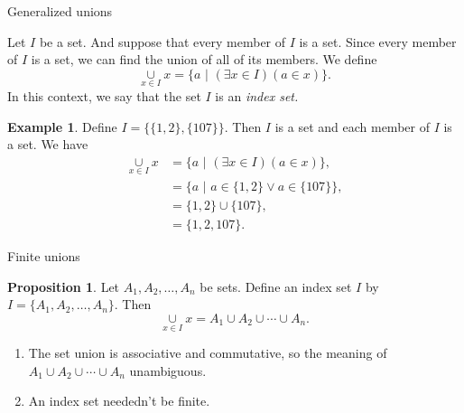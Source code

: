 \documentclass[fleqn]{beamer}
\theoremstyle{definition}
\newtheorem{myex}{Example}
\newtheorem{myth}{Proposition}
\begin{document}
\begin{frame}{Generalized unions}

Let \(I\) be a set. And suppose that every member of \(I\) is a set.  Since every member of \(I\) is a set, we can find the union of all of its members. We define
\[
    \underset{x \in I}{\cup} x  = \{ a  \, \,  | \, \, (\exists x \in I)(a \in x) \}.
\]
In this context, we say that the set \(I\) is an \emph{index set.}

\begin{myex}  Define \(I = \{ \{1,2\}, \{107\} \} \). Then \(I\) is a set and each member of \(I\) is a set. We have
\begin{align*}
 \underset{x \in I}{\cup} x  &= \{ a  \, \,  | \, \, (\exists x \in I)(a \in x) \}, \\
                                                   &= \{ a  \, \,  | \, \,   a \in   \{1,2\}  \lor    a \in   \{107\} \}, \\
                                                   &= \{1,2\}  \cup \{107\}, \\
                                                   &= \{1,2,107\}.
\end{align*}

\end{myex}
\end{frame}

\begin{frame}{Finite unions}
\begin{myth} Let \(A_1, A_2, \dots, A_n\) be sets.  Define an index set \(I\) by  \(I = \{A_1, A_2, \dots, A_n \} \). Then
\[
   \underset{x \in I}{\cup} x = A_1 \cup A_2 \cup \cdots \cup A_n.
\]
\end{myth}
\begin{enumerate}
  \item The set union is associative and commutative, so  the meaning of \(A_1 \cup A_2 \cup \cdots \cup A_n \) unambiguous.

  \item An index set neededn't be finite.
\end{enumerate}
\end{frame}
\end{document}
